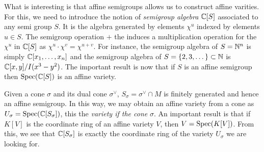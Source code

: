             What is interesting is that affine semigroups allows us to construct affine varities. For this, we need to introduce the notion of \emph{semigroup algebra} $\mathbb{C}[S]$ associated to any semi group $S$. It is the algebra generated by elements $\chi^u$ indexed by elements $u\in S$. The semigroup operation $+$ the induces a multiplication operation for the $\chi^u$ in $\mathbb{C}[S]$ as $\chi^u\cdot\chi^v=\chi^{u+v}$. For instance, the semigroup algebra of $S=\mathbb{N}^n$ is simply $\mathbb{C}[x_1,\dots,x_n]$ and the semigroup algebra of $S=\{2,3,\dots\}\subset\mathbb{N}$ is $\mathbb{C}[x,y]/I(x^3-y^2)$. The important result is now that if $S$ is an affine semigroup then $\text{Spec}(\mathbb{C}[S])$ is an affine variety.

            Given a cone $\sigma$ and its dual cone $\sigma^\vee$, $S_\sigma=\sigma^\vee\cap M$ is finitely generated and hence an affine semigroup. In this way, we may obtain an affine variety from a cone as $U_\sigma=\text{Spec}(\mathbb{C}[S_\sigma])$, this the \emph{variety if the cone} $\sigma$. An important result is that if $K[V]$ is the coordinate ring of an affine variety $V$, then $V=\text{Spec}(K[V])$. From this, we see that $\mathbb{C}[S_\sigma]$ is exactly the coordinate ring of the variety $U_\sigma$ we are looking for.
            
